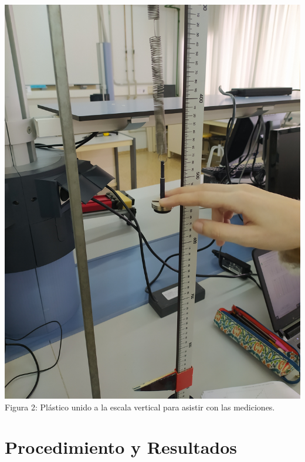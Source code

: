 \documentclass{article}
\begin{document}
\begin{multicols}{2}
\begin{center}
  \includegraphics[scale=0.06, angle=-90, trim={3000 0 0 0}, clip]{figures/muelle_montado.jpg}\\
  Figura 2: Plástico unido a la escala vertical para asistir con las mediciones.
\end{center}

\section*{Procedimiento y Resultados}


\end{multicols}
\end{document}
